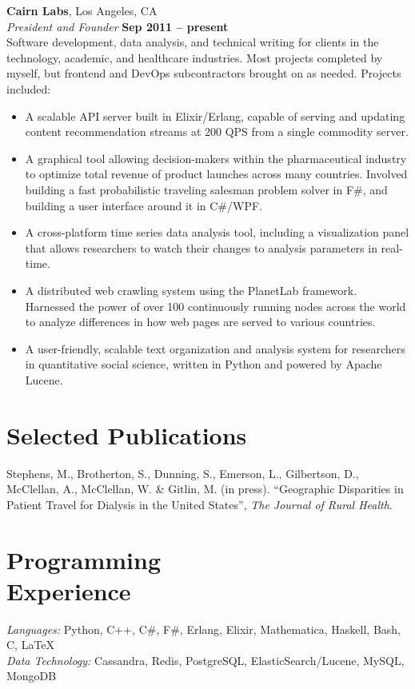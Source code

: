 \documentclass[margin,line]{resume}
\begin{document}
\begin{resume}
    \textbf{Cairn Labs}, Los Angeles, CA \vspace{2mm}\\\vspace{1mm}%
    \textsl{President and Founder} \hfill \textbf{Sep 2011 -- present}\\
    Software development, data analysis, and technical writing for clients in the technology, academic, and healthcare industries. Most projects completed by myself, but frontend and DevOps subcontractors brought on as needed. Projects included:
    \begin{itemize}
        \item A scalable API server built in Elixir/Erlang, capable of serving and updating content recommendation streams at 200 QPS from a single commodity server.
        \item A graphical tool allowing decision-makers within the pharmaceutical industry to optimize total revenue of product launches across many countries. Involved building a fast probabilistic traveling salesman problem solver in F\#, and building a user interface around it in C\#/WPF.
        \item A cross-platform time series data analysis tool, including a visualization panel that allows researchers to watch their changes to analysis parameters in real-time.
        \item A distributed web crawling system using the PlanetLab framework. Harnessed the power of over 100 continuously running nodes across the world to analyze differences in how web pages are served to various countries.
        \item A user-friendly, scalable text organization and analysis system for researchers in quantitative social science, written in Python and powered by Apache Lucene.
    \end{itemize}

   \section{\mysidestyle Selected Publications}
    Stephens, M., Brotherton, S., Dunning, S., Emerson, L., Gilbertson, D., McClellan, A., McClellan, W. \& Gitlin, M. (in press). ``Geographic Disparities in Patient Travel for Dialysis in the United States'', \textsl{The Journal of Rural Health}.
\vspace{-2mm}

    \section{\mysidestyle Programming\\Experience}

    \emph{Languages:} Python, C++, C\#, F\#, Erlang, Elixir, Mathematica, Haskell, Bash, C, \LaTeX \\
    \emph{Data Technology:} Cassandra, Redis, PostgreSQL, ElasticSearch/Lucene, MySQL, MongoDB
\end{resume}
\end{document}
